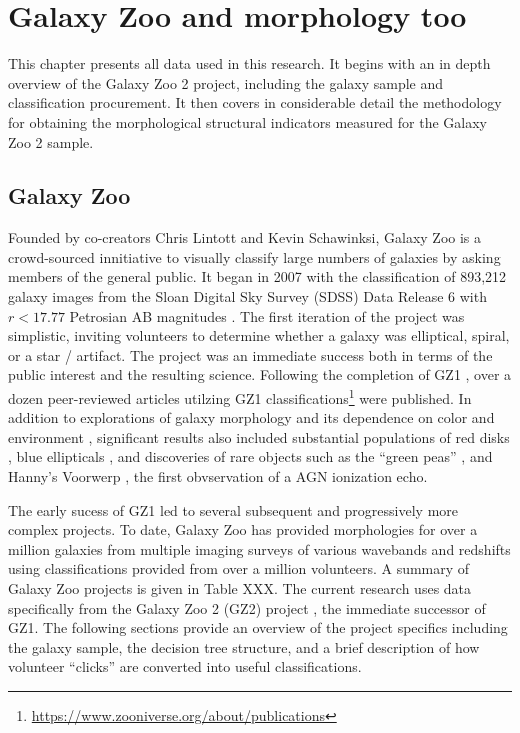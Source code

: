 
\chapter{Galaxy Zoo and morphology too}
\label{chap:2}


This chapter presents all data used in this research. It begins with an in depth overview of the Galaxy Zoo 2 project, including the galaxy sample and classification procurement. It then covers in considerable detail the methodology for obtaining the morphological structural indicators measured for the Galaxy Zoo 2 sample. 


\section{Galaxy Zoo}
Founded by co-creators Chris Lintott and Kevin Schawinksi, Galaxy Zoo is a crowd-sourced innitiative to visually classify large numbers of galaxies by asking members of the general public. It began in 2007 with the classification of 893,212 galaxy images from the Sloan Digital Sky Survey (SDSS) Data Release 6 with $r < 17.77$ Petrosian AB magnitudes \cite{Strauss2002,Adelman2008}. The first iteration of the project was simplistic, inviting volunteers to determine whether a galaxy was elliptical, spiral, or a star / artifact. The project was an immediate success both in terms of the public interest and the resulting science. Following the completion of GZ1 \cite{Lintott2008}, over a dozen peer-reviewed articles utilzing GZ1 classifications\footnote{\url{https://www.zooniverse.org/about/publications}} were published. In addition to explorations of galaxy morphology and its dependence on color and environment \cite{Skibba2009, Bamford2009}, significant results also included substantial populations of red disks \cite{Masters2010b}, blue ellipticals \cite{Schawinski2009}, and discoveries of rare objects such as the ``green peas'' \cite{Cardamone2009}, and Hanny's Voorwerp \cite{Lintott2009}, the first obvservation of a AGN ionization echo. 

The early sucess of GZ1 led to several subsequent and progressively more complex projects. To date, Galaxy Zoo has provided morphologies for over a million galaxies from multiple imaging surveys of various wavebands and redshifts using classifications provided from over a million volunteers. A summary of Galaxy Zoo projects is given in Table XXX. The current research uses data specifically from the Galaxy Zoo 2 (GZ2) project \cite{Willett2013}, the immediate successor of GZ1. The following sections provide an overview of the project specifics including the galaxy sample, the decision tree structure, and a brief description of how volunteer ``clicks'' are converted into useful classifications. 


